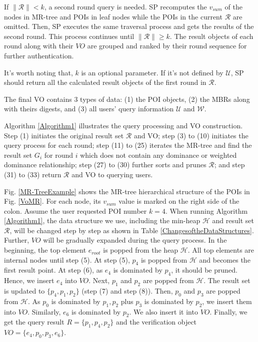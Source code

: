 \documentclass[10pt, conference, compsocconf]{IEEEtran}
\begin{document}
If $\|\mathcal{R}\| < k$, a second round query is needed. SP recomputes the $v_{sum}$ of the nodes in MR-tree and POIs in leaf nodes while the POIs in the current $\mathcal{R}$ are omitted. Then, SP executes the same traversal process and gets the results of the second round. This process continues until $\|\mathcal{R}\| \geq k$. The result objects of each round along with their $VO$ are grouped and ranked by their round sequence for further authentication. 

It's worth noting that, $k$ is an optional parameter. If it's not defined by $\mathcal{U}$, SP should return all the calculated result objects of the first round in $\mathcal{R}$.

The final VO contains 3 types of data: (1) the POI objects, (2) the MBRs along with theirs digests, and (3) all users' query information $\mathcal{U}$ and $\mathcal{W}$.

Algorithm \ref{Algorithm1} illustrates the query processing and VO construction. Step (1) initiates the original result set $\mathcal{R}$ and VO; step (3) to (10) initiates the query process for each round; step (11) to (25) iterates the MR-tree and find the result set $G_i$ for round $i$ which does not contain any dominance or weighted dominance relationship; step (27) to (30) further sorts and prunes $\mathcal{R}$; and step (31) to (33) return $\mathcal{R}$ and VO to querying users.

Fig. \ref{MR-TreeExample} shows the MR-tree hierarchical structure of the POIs in Fig. \ref{VoMR}. For each node, its $v_{sum}$ value is marked on the right side of the colon. Assume the user requested POI number $k = 4$. When running Algorithm \ref{Algorithm1}, the data structure we use, including the min-heap $\mathcal{H}$ and result set $\mathcal{R}$, will be changed step by step as shown in Table \ref{ChangesoftheDataStructures}. Further, $VO$ will be gradually expanded during the query process. In the beginning, the top element $e_{root}$ is popped from the heap $\mathcal{H}$. All top elements are internal nodes until step (5). At step (5), $p_4$ is popped from $\mathcal{H}$ and becomes the first result point. At step (6), as $e_4$ is dominated by $p_4$, it should be pruned. Hence, we insert $e_4$ into $VO$. Next, $p_1$ and $p_2$ are popped from $\mathcal{H}$. The result set is updated to $\{p_4,p_1,p_2\}$ (step (7) and step (8)). Then, $p_0$ and $p_3$ are popped from $\mathcal{H}$. As $p_0$ is dominated by $p_1, p_2$ plus $p_3$ is dominated by $p_2$, we insert them into $VO$. Similarly, $e_6$ is dominated by $p_2$. We also insert it into $VO$. Finally, we get the query result $R= \{p_1,p_4,p_2\}$ and the verification object $VO = \{e_4,p_0,p_3,e_6\}$.
\end{document}
